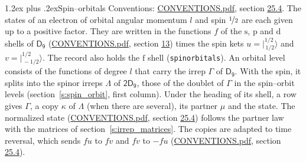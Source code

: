 \documentclass[10pt,a4paper]{article}
\makeatletter
\renewcommand\section{\@startsection{section}{1}{\z@}{-3ex plus -1ex minus -.2ex}%
  {1.2ex plus .2ex}{\normalfont\large\sffamily\bfseries\color{parttitle}}}
\numberwithin{equation}{section}
\newcommand{\grp}[1]{\mathsf{#1}}
\newcommand{\orbital}[1]{\mathrm{#1}}
\newcommand{\mult}{\kappa}
\newcommand{\intx}{\mu}
\newcommand{\jm}[2]{\bigl\lvert{}^{#1}_{\,#2}\bigr\rangle}
\makeatother
\begin{document}
\section{Spin--orbitals}\label{s:spin_orbitals}
Conventions: \href{../../CONVENTIONS.pdf}{CONVENTIONS.pdf}, section \href{../../CONVENTIONS.pdf\#conv.25.4}{25.4}.
\leavevmode\label{n:index.orbital.l}The states of an electron of orbital angular momentum $l$ and spin $\nicefrac{1}{2}$ are each given up to a positive factor. \label{n:local.spinor.uv}\label{n:local.function.f}They are written in the functions $f$ of the $\orbital{s}$, $\orbital{p}$ and $\orbital{d}$ shells of \href{../../../rotation/data/pdf/D9.pdf}{$\grp{D_{9}}$} (\href{../../CONVENTIONS.pdf}{CONVENTIONS.pdf}, section \href{../../../rotation/CONVENTIONS.pdf\#conv.13}{13}) times the spin kets $u = \jm{1/2}{1/2}$ and $v = \jm{1/2}{-1/2}$. The record also holds the $\orbital{f}$ shell (\texttt{spinorbitals}). An orbital level consists of the functions of degree $l$ that carry the irrep $\Gamma$ of \href{../../../rotation/data/pdf/D9.pdf}{$\grp{D_{9}}$}. With the spin, it splits into the spinor irreps $\Lambda$ of $\grp{2D_{9}}$, those of the doublet of $\Gamma$ in the spin--orbit levels (section~\ref{s:spin_orbit}, first column). \label{n:head.state}Under the heading of its shell, a row gives $\Gamma$, a copy $\mult$ of $\Lambda$ (when there are several), its partner $\intx$ and the state. The normalized state (\href{../../CONVENTIONS.pdf}{CONVENTIONS.pdf}, section \href{../../CONVENTIONS.pdf\#conv.25.4}{25.4}) follows the partner law with the matrices of section~\ref{s:irrep_matrices}. The copies are adapted to time reversal, which sends $f u$ to $f v$ and $f v$ to $-f u$ (\href{../../CONVENTIONS.pdf}{CONVENTIONS.pdf}, section \href{../../CONVENTIONS.pdf\#conv.25.4}{25.4}).
\end{document}
